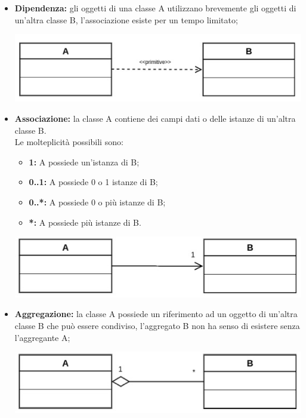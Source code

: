 	\begin{itemize}
		\item \textbf{Dipendenza:} gli oggetti di una classe A utilizzano brevemente gli oggetti di un'altra classe B, l'associazione esiste per un tempo limitato;
		\begin{center}
			\includegraphics[scale=0.4]{Immagini/UML/Dipendenza} \\
		\end{center}
		\item \textbf{Associazione:} la classe A contiene dei campi dati o delle istanze di un'altra classe B. \\ Le molteplicità possibili sono:
		\begin{itemize}
			\item \textbf{1:} A possiede un'istanza di B;
			\item \textbf{0..1:} A possiede 0 o 1 istanze di B;
			\item \textbf{0..*:} A possiede 0 o più istanze di B;
			\item \textbf{*:} A possiede più istanze di B.
		\end{itemize}
		\begin{center}
			\includegraphics[scale=0.4]{Immagini/UML/Associazione} \\
		\end{center}
		\item \textbf{Aggregazione:} la classe A possiede un riferimento ad un oggetto di un'altra classe B che può essere condiviso, l'aggregato B non ha senso di esistere senza l'aggregante A;
		\begin{center}
			\includegraphics[scale=0.4]{Immagini/UML/Aggregazione}\\

\end{center}
\end{itemize}
